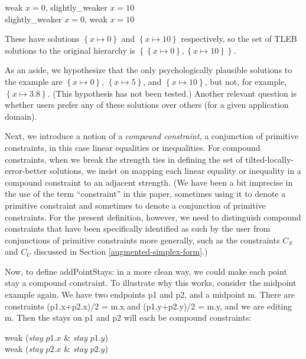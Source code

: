 \documentclass{article}
\newcommand{\strength}{\sf}
\begin{document}
\hspace*{1cm} {\strength weak} $x=0$, {\strength slightly\_weaker} $x=10$ \\
\hspace*{1cm} {\strength slightly\_weaker} $x=0$, {\strength weak} $x=10$

These have solutions $\left\{ x \mapsto 0 \right\}$ and 
$\left\{ x \mapsto 10 \right\}$ respectively, so the set of TLEB 
solutions to the original hierarchy is 
$\left\{ \left\{ x \mapsto 0 \right\} , 
    \left\{ x \mapsto 10 \right\} \right\}$.  

As an aside, we hypothesize that the only psychologically plausible
solutions to the example are $\left\{ x \mapsto 0\right\}$, 
$\left\{ x \mapsto 5\right\} $, and $\left\{ x \mapsto 10\right\}$, 
but not, for example, $\left\{ x \mapsto 3.8\right\} $. (This hypothesis
has not been tested.)  Another relevant question is whether users prefer any
of these solutions over others (for a given application domain).

Next, we introduce a notion of a \emph{compound constraint}, a conjunction
of primitive constraints, in this case linear equalities or inequalities.
For compound constraints, when we break the strength ties in defining the
set of tilted-locally-error-better solutions, we insist on mapping each
linear equality or inequality in a compound constraint to an adjacent
strength.  (We have been a bit imprecise in the use of the term
``constraint'' in this paper, sometimes using it to denote a primitive
constraint and sometimes to denote a conjunction of primitive constraints.
For the present definition, however, we need to distinguish compound
constraints that have been specifically identified as such by the user
from conjunctions of primitive constraints more generally, such as the
constraints $C_S$ and $C_U$ discussed in Section \ref{augmented-simplex-form}.)

Now, to define {\sf addPointStays:} in a more clean way, we could make each
point stay a compound constraint.  To illustrate why this works, consider
the midpoint example again.  We have two endpoints {\sf p1} and {\sf p2},
and a midpoint {\sf m}.  There are constraints {\sf (p1.x+p2.x)/2 = m.x}
and {\sf (p1.y+p2.y)/2 = m.y}, and we are editing {\sf m}.  Then the stays
on {\sf p1} and {\sf p2} will each be compound constraints:

\hspace*{1cm} {\strength weak} (\emph{stay} $p1.x$ \& \emph{stay} $p1.y$) \\
\hspace*{1cm} {\strength weak} (\emph{stay} $p2.x$ \& \emph{stay} $p2.y$)
\end{document}
